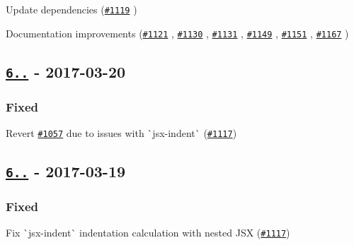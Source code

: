 \begin{DoxyItemize}
\item Update dependencies (\href{https://github.com/yannickcr/eslint-plugin-react/pull/1119}{\tt \#1119} )
\item Documentation improvements (\href{https://github.com/yannickcr/eslint-plugin-react/pull/1121}{\tt \#1121} , \href{https://github.com/yannickcr/eslint-plugin-react/pull/1130}{\tt \#1130} , \href{https://github.com/yannickcr/eslint-plugin-react/pull/1131}{\tt \#1131} , \href{https://github.com/yannickcr/eslint-plugin-react/pull/1149}{\tt \#1149} , \href{https://github.com/yannickcr/eslint-plugin-react/pull/1151}{\tt \#1151} , \href{https://github.com/yannickcr/eslint-plugin-react/pull/1167}{\tt \#1167} )
\end{DoxyItemize}

\subsection*{\href{https://github.com/yannickcr/eslint-plugin-react/compare/v6.10.2...v6.10.3}{\tt 6..} -\/ 2017-\/03-\/20}

\subsubsection*{Fixed}


\begin{DoxyItemize}
\item Revert \href{https://github.com/yannickcr/eslint-plugin-react/issues/1057}{\tt \#1057} due to issues with \`{}jsx-\/indent\`{} (\href{https://github.com/yannickcr/eslint-plugin-react/issues/1117}{\tt \#1117})
\end{DoxyItemize}

\subsection*{\href{https://github.com/yannickcr/eslint-plugin-react/compare/v6.10.1...v6.10.2}{\tt 6..} -\/ 2017-\/03-\/19}

\subsubsection*{Fixed}


\begin{DoxyItemize}
\item Fix \`{}jsx-\/indent\`{} indentation calculation with nested J\+SX (\href{https://github.com/yannickcr/eslint-plugin-react/issues/1117}{\tt \#1117})
\end{DoxyItemize}

